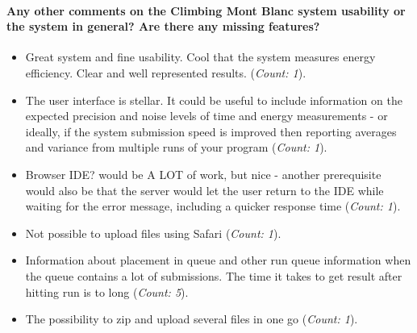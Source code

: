 \paragraph*{Any other comments on the Climbing Mont Blanc system usability or the system in general? Are there any missing features?}
\begin{itemize}
  \item Great system and fine usability. Cool that the system measures energy efficiency. Clear and well represented results.  (\textit{Count: 1}).
  \item The user interface is stellar. It could be useful to include information on the expected precision and noise levels of time and energy measurements - or ideally, if the system submission speed is improved then reporting averages and variance from multiple runs of your program (\textit{Count: 1}).
  \item Browser IDE? would be A LOT of work, but nice - another prerequisite would also be that the server would let the user return to the IDE while waiting for the error message, including a quicker response time (\textit{Count: 1}).
  \item Not possible to upload files using Safari (\textit{Count: 1}).
  \item Information about placement in queue and other run queue information when the queue contains a lot of submissions. The time it takes to get result after hitting run is to long (\textit{Count: 5}).
  \item The possibility to zip and upload several files in one go (\textit{Count: 1}).
\end{itemize}


